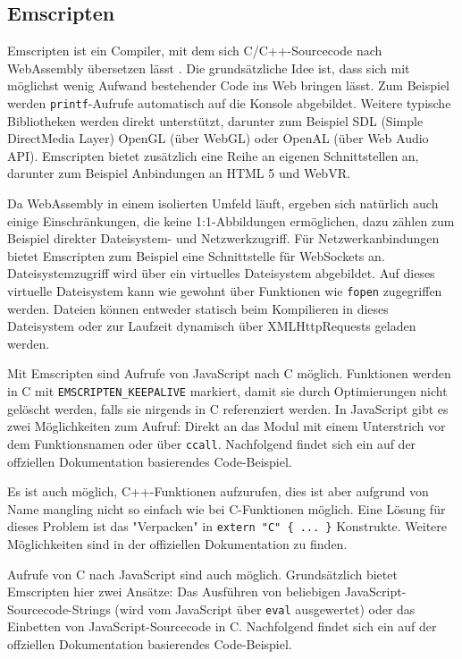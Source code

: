 \subsection{Emscripten}

Emscripten ist ein Compiler, mit dem sich C/C++-Sourcecode nach WebAssembly übersetzen lässt \cite{Emscripten}. Die grundsätzliche Idee ist, dass sich mit möglichst wenig Aufwand bestehender Code ins Web bringen lässt. Zum Beispiel werden \lstinline{printf}-Aufrufe automatisch auf die Konsole abgebildet. Weitere typische Bibliotheken werden direkt unterstützt, darunter zum Beispiel SDL (Simple DirectMedia Layer) OpenGL (über WebGL) oder OpenAL (über Web Audio API). Emscripten bietet zusätzlich eine Reihe an eigenen Schnittstellen an, darunter zum Beispiel Anbindungen an HTML 5 und WebVR.

Da WebAssembly in einem isolierten Umfeld läuft, ergeben sich natürlich auch einige Einschränkungen, die keine 1:1-Abbildungen ermöglichen, dazu zählen zum Beispiel direkter Dateisystem- und Netzwerkzugriff. Für Netzwerkanbindungen bietet Emscripten zum Beispiel eine Schnittstelle für WebSockets an. Dateisystemzugriff wird über ein virtuelles Dateisystem abgebildet. Auf dieses virtuelle Dateisystem kann wie gewohnt über Funktionen wie \lstinline{fopen} zugegriffen werden. Dateien können entweder statisch beim Kompilieren in dieses Dateisystem oder zur Laufzeit dynamisch über XMLHttpRequests geladen werden.

Mit Emscripten sind Aufrufe von JavaScript nach C möglich. Funktionen werden in C mit \lstinline{EMSCRIPTEN_KEEPALIVE} markiert, damit sie durch Optimierungen nicht gelöscht werden, falls sie nirgends in C referenziert werden. In JavaScript gibt es zwei Möglichkeiten zum Aufruf: Direkt an das Modul mit einem Unterstrich vor dem Funktionsnamen oder über \lstinline{ccall}. Nachfolgend findet sich ein auf der offziellen Dokumentation basierendes Code-Beispiel.



Es ist auch möglich, C++-Funktionen aufzurufen, dies ist aber aufgrund von Name mangling nicht so einfach wie bei C-Funktionen möglich. Eine Lösung für dieses Problem ist das "Verpacken" in \lstinline|extern "C" { ... }| Konstrukte. Weitere Möglichkeiten sind in der offiziellen Dokumentation zu finden.

Aufrufe von C nach JavaScript sind auch möglich. Grundsätzlich bietet Emscripten hier zwei Ansätze: Das Ausführen von beliebigen JavaScript-Sourcecode-Strings (wird vom JavaScript über \lstinline{eval} ausgewertet) oder das Einbetten von JavaScript-Sourcecode in C. Nachfolgend findet sich ein auf der offziellen Dokumentation basierendes Code-Beispiel.

